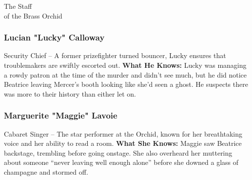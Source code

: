 \begin{NPC}[description=The people who keep the Orchid running]{The Staff\\ of the Brass Orchid}
	\subsubsection*{Lucian "Lucky" Calloway}
	Security Chief – A former prizefighter turned bouncer, Lucky ensures that troublemakers are swiftly escorted out.
	\textbf{What He Knows:} Lucky was managing a rowdy patron at the time of the murder and didn't see much, but he did notice Beatrice leaving Mercer’s booth looking like she'd seen a ghost. He suspects there was more to their history than either let on.

	\subsubsection*{Marguerite "Maggie" Lavoie} 
	Cabaret Singer – The star performer at the Orchid, known for her breathtaking voice and her ability to read a room.
	\textbf{What She Knows:} Maggie saw Beatrice backstage, trembling before going onstage. She also overheard her muttering about someone “never leaving well enough alone” before she downed a glass of champagne and stormed off.
\end{NPC}